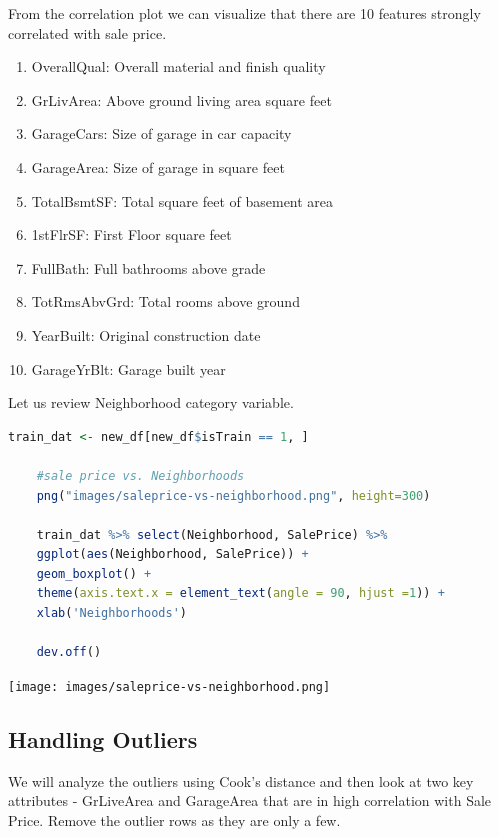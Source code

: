 \documentclass[sigconf]{acmart}
\begin{document}
	
	From the correlation plot we can visualize that there are 10 features strongly correlated with sale price. 
	
	\begin{enumerate}
		\item OverallQual: Overall material and finish quality
		\item GrLivArea: Above ground living area square feet
		\item GarageCars: Size of garage in car capacity
		\item GarageArea: Size of garage in square feet
		\item TotalBsmtSF: Total square feet of basement area
		\item 1stFlrSF: First Floor square feet
		\item FullBath: Full bathrooms above grade
		\item TotRmsAbvGrd: Total rooms above ground
		\item YearBuilt: Original construction date
		\item GarageYrBlt: Garage built year		
		
	\end{enumerate}
	
	Let us review Neighborhood category variable.
	
	\begin{lstlisting}[language=R]
	train_dat <- new_df[new_df$isTrain == 1, ]
	
	#sale price vs. Neighborhoods
	png("images/saleprice-vs-neighborhood.png", height=300)
	
	train_dat %>% select(Neighborhood, SalePrice) %>% 
	ggplot(aes(Neighborhood, SalePrice)) + 
	geom_boxplot() + 
	theme(axis.text.x = element_text(angle = 90, hjust =1)) + 
	xlab('Neighborhoods')
	
	dev.off()
	\end{lstlisting}
	
	\begin{center}
		\texttt{[image: images/saleprice-vs-neighborhood.png]}	
		
	\end{center}
	
	\subsection{Handling Outliers}

	We will analyze the outliers using Cook's distance and then look at two key attributes - GrLiveArea and GarageArea that are in high correlation with Sale Price. Remove the outlier rows as they are only a few.
	
\end{document}
